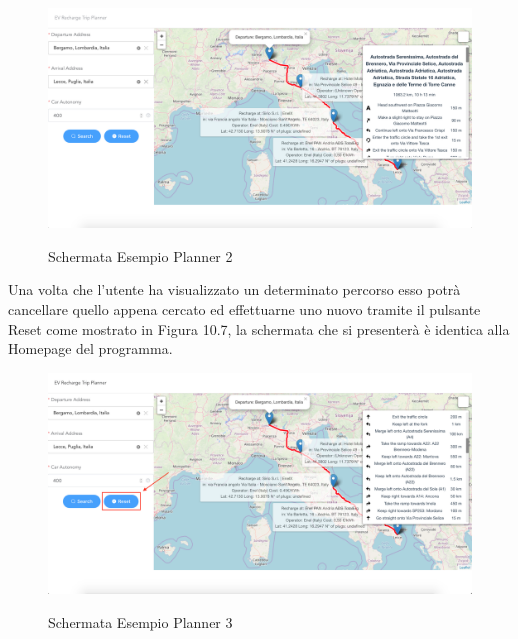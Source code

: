 \begin{figure}[h]
\centering
{\includegraphics[scale=0.3]{Immagini/Schermata_esempio_planner.png}}
\caption{Schermata Esempio Planner 2}
\end{figure}

Una volta che l'utente ha visualizzato un determinato percorso esso potrà cancellare quello appena cercato ed effettuarne uno nuovo tramite il pulsante Reset come mostrato in Figura 10.7, la schermata che si presenterà è identica alla Homepage del programma.

\begin{figure}[h]
\centering
{\includegraphics[scale=0.3]{Immagini/Schermata_esempio_planner_Reset.png}}
\caption{Schermata Esempio Planner 3}
\end{figure}




